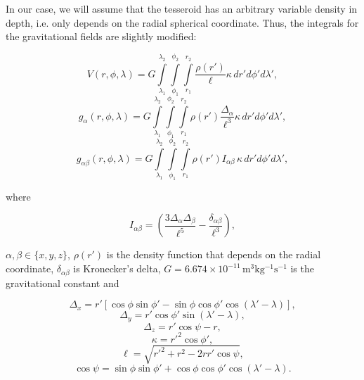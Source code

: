 \documentclass[extra]{gji}
\begin{document}
In our case, we will assume that the tesseroid has an arbitrary 
variable density in depth, i.e. only depends on the radial spherical 
coordinate.
Thus, the integrals for the gravitational fields are slightly modified:

\begin{equation}
    V(r,\phi,\lambda) = G
    \int\limits_{\lambda_1}^{\lambda_2}
    \int\limits_{\phi_1}^{\phi_2}
    \int\limits_{r_1}^{r_2}
    \frac{\rho(r')}{\ell} \kappa \,  dr' d\phi' d\lambda',
\label{eq:tesseroid-pot}
\end{equation}
\begin{equation}
    g_{\alpha}(r,\phi,\lambda) = G
    \int\limits_{\lambda_1}^{\lambda_2}
    \int\limits_{\phi_1}^{\phi_2}
    \int\limits_{r_1}^{r_2}
    \rho(r') \frac{\Delta_\alpha}{\ell^3}
    \kappa \, dr' d\phi' d\lambda',
\label{eq:tesseroid-grav}
\end{equation}
\begin{equation}
    g_{\alpha\beta}(r,\phi,\lambda) = G
    \int\limits_{\lambda_1}^{\lambda_2}
    \int\limits_{\phi_1}^{\phi_2}
    \int\limits_{r_1}^{r_2}
    \rho(r') I_{\alpha\beta} \, \kappa \, dr' d\phi' d\lambda' ,
    \label{eq:tesseroid-tensor}
\end{equation}

\noindent where

\begin{equation}
    I_{\alpha\beta} =
    \left(
        \frac{3\Delta_{\alpha} \Delta_{\beta}}{\ell^5} -
        \frac{\delta_{\alpha\beta}}{\ell^3}
    \right) ,
    \label{eq:tesseroid-tensor-kernel}
\end{equation}

\noindent $\alpha, \beta \in \{x, y, z\}$, $\rho(r')$ is the density 
function that depends on the radial coordinate, $\delta_{\alpha\beta}$ 
is Kronecker's delta, $G = 6.674\times10^{-11}\, 
\text{m$^3$kg$^{-1}$s$^{-1}$}$ is the gravitational constant and

\begin{equation}
    \Delta_x = r'[\cos\phi\sin\phi' - \sin\phi\cos\phi'
               \cos(\lambda' - \lambda)],
\end{equation}
\begin{equation}
    \Delta_y = r' \cos \phi' \sin(\lambda' - \lambda),
\end{equation}
\begin{equation}
    \Delta_z = r' \cos \psi - r,
\end{equation}
\begin{equation}
    \kappa = {r'}^2 \cos \phi',
\end{equation}
\begin{equation}
    \ell = \sqrt{{r'}^2 + r^2 - 2 r r' \cos \psi},
\label{eq:ell}
\end{equation}
\begin{equation}
    \cos\psi = \sin\phi\sin\phi' + \cos\phi\cos\phi'
                 \cos(\lambda' - \lambda).
\label{eq:cospsi}
\end{equation}
\end{document}
